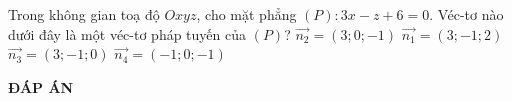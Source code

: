 \begin{ex}%
	Trong không gian toạ độ $Oxyz$, cho mặt phẳng $(P)\colon 3x-z+6=0$. Véc-tơ nào dưới đây là một véc-tơ pháp tuyến của $(P)$?
	\choice
	{\True $\vec{n_2}=(3;0;-1)$}
	{$\vec{n_1}=(3;-1;2)$}
	{$\vec{n_3}=(3;-1;0)$}
	{$\vec{n_4}=(-1;0;-1)$}
\end{ex}
\newpage
\begin{center}
	\textbf{ĐÁP ÁN}
\end{center}
\begin{multicols}{10}
	 
\end{multicols}
